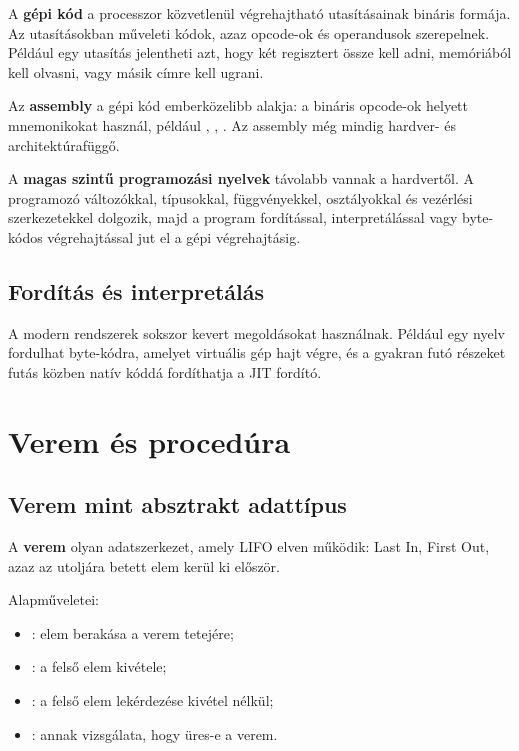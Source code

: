 A \textbf{gépi kód} a processzor közvetlenül végrehajtható utasításainak bináris formája. Az utasításokban műveleti kódok, azaz opcode-ok és operandusok szerepelnek. Például egy utasítás jelentheti azt, hogy két regisztert össze kell adni, memóriából kell olvasni, vagy másik címre kell ugrani.

Az \textbf{assembly} a gépi kód emberközelibb alakja: a bináris opcode-ok helyett mnemonikokat használ, például , , . Az assembly még mindig hardver- és architektúrafüggő.

A \textbf{magas szintű programozási nyelvek} távolabb vannak a hardvertől. A programozó változókkal, típusokkal, függvényekkel, osztályokkal és vezérlési szerkezetekkel dolgozik, majd a program fordítással, interpretálással vagy byte-kódos végrehajtással jut el a gépi végrehajtásig.

\subsection{Fordítás és interpretálás}

\begin{center}

\end{center}

A modern rendszerek sokszor kevert megoldásokat használnak. Például egy nyelv fordulhat byte-kódra, amelyet virtuális gép hajt végre, és a gyakran futó részeket futás közben natív kóddá fordíthatja a JIT fordító.

\section{Verem és procedúra}

\subsection{Verem mint absztrakt adattípus}

A \textbf{verem} olyan adatszerkezet, amely LIFO elven működik: Last In, First Out, azaz az utoljára betett elem kerül ki először.

Alapműveletei:

\begin{itemize}
  \item {}: elem berakása a verem tetejére;
  \item {}: a felső elem kivétele;
  \item {}: a felső elem lekérdezése kivétel nélkül;
  \item {}: annak vizsgálata, hogy üres-e a verem.
\end{itemize}

